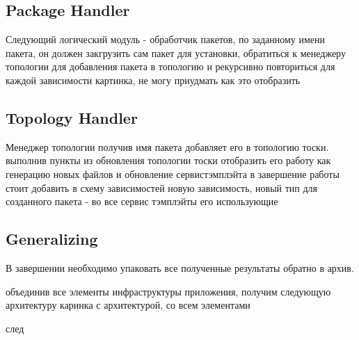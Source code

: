 \fi
\subsection{Package Handler}
Следующий логический модуль - обработчик пакетов, по заданному имени пакета, он должен закгрузить сам пакет для установки, обратиться к менеджеру топологии для добавления пакета в топологию и рекурсивно повториться для каждой зависимости
картинка, не могу приудмать как это отобразить


\fi
\subsection{Topology Handler}
Менеджер топологии получив имя пакета добавляет его в топологию тоски. выполнив пункты из обновления топологии тоски
отобразить его работу как генерацию новых файлов и обновление сервистэмплэйта
в завершение работы стоит добавить в схему зависимостей новую зависимость, новый тип для созданного пакета - во все сервис тэмплэйты его использующие


\fi
\subsection{Generalizing}
В завершении необходимо упаковать все полученные результаты обратно в архив.

объединив все элементы инфраструктуры приложения,  получим следующую архитектуру
каринка с архитектурой, со всем элементами

след



\fi